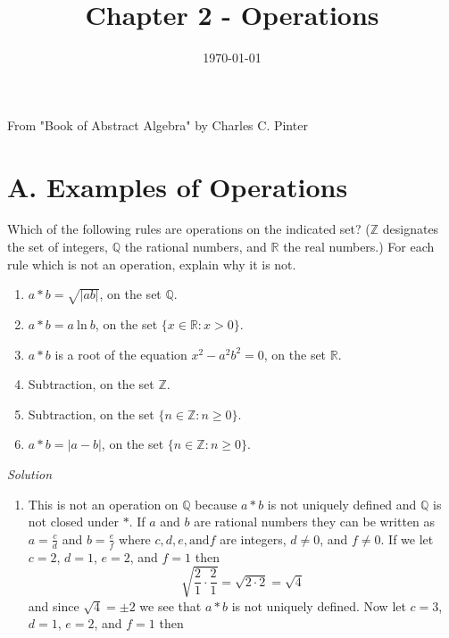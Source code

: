 \documentclass[12pt]{article}
\begin{document}
\title{Chapter 2 - Operations}
\date{\today}
\maketitle

\begin{flushleft}
  From "Book of Abstract Algebra" by Charles C. Pinter
  \section*{A. Examples of Operations}
  Which of the following rules are operations on the indicated set? ($\mathbb{Z}$ 
  designates the set of integers, $\mathbb{Q}$ the rational numbers, and $\mathbb{R}$ 
  the real numbers.) For each rule which is not an operation, explain why it is not.
    \begin{enumerate}
      \item $a * b = \sqrt{|ab|}$, on the set $\mathbb{Q}$.
      \item $a * b = a~\text{ln}~b$, on the set $\{x \in \mathbb{R}: x > 0\}$.
      \item $a * b$ is a root of the equation $x^{2} - a^{2}b^{2} = 0$, on the set $\mathbb{R}$.
      \item Subtraction, on the set $\mathbb{Z}$.
      \item Subtraction, on the set $\{ n \in \mathbb{Z}:n \geq 0 \}$.
      \item $a * b = |a-b|$, on the set $\{ n \in \mathbb{Z}: n \geq 0 \}$.
        \end{enumerate}
        \textit{Solution} \\
        \begin{enumerate}
          \item This is not an operation on $\mathbb{Q}$ because $a * b$ is not uniquely defined 
            and $\mathbb{Q}$ is not closed under $*$. If $a$ and $b$ are rational numbers they can 
            be written as $a = \frac{c}{d}$ and $b = \frac{e}{f}$ where $c, d, e, \text{and} f$ are 
            integers, $d \neq 0$, and $f \neq 0$. If we let $c = 2$, $d = 1$, $e = 2$, and $f = 1$ then
            \begin{equation*}
              \sqrt{ \frac{2}{1} \cdot \frac{2}{1} } = \sqrt{ 2 \cdot 2 } = \sqrt{4}
            \end{equation*}
            and since $ \sqrt{4} = \pm 2$ we see that $a * b$ is not uniquely defined. Now let $c = 3$, $d = 1$, 
            $e = 2$, and $f = 1$ then
            \begin{equation*}

\end{equation*}
\end{enumerate}
\end{flushleft}
\end{document}

